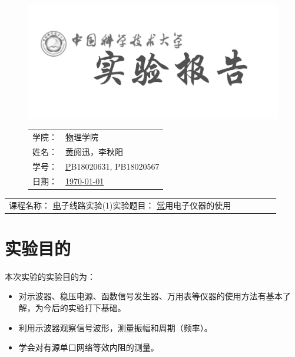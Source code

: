 \documentclass[a4paper,11pt,UTF8]{ctexart}
\newcommand{\major}{物理学院}
\newcommand{\name}{黄阅迅，李秋阳}
\newcommand{\stuid}{PB18020631, PB18020567}
\newcommand{\newdate}{\today}
\newcommand{\course}{电子线路实验(1)}
\newcommand{\newtitle}{常用电子仪器的使用}
\begin{document}
\thispagestyle{empty}
\begin{figure}[h]
  \begin{minipage}{0.6\linewidth}
    \centerline{\includegraphics[width=\linewidth]{logo.png}}
  \end{minipage}
  \hfill
  \begin{minipage}{.4\linewidth}
    \raggedleft
    \begin{tabular*}{.8\linewidth}{ll}
      学院： & \underline\major   \\
      姓名： & \underline\name    \\
      学号： & \underline\stuid   \\
      日期： & \underline\newdate \\
    \end{tabular*}
  \end{minipage}
\end{figure}

\begin{table}[!htbp]
  \centering
  \begin{tabular*}{\linewidth}{llllll}
    课程名称：  \underline\course   \qquad\qquad 实验题目：  \underline\newtitle  
  \end{tabular*}
\end{table}


\section{实验目的}
本次实验的实验目的为：
\begin{itemize}
  \item 对示波器、稳压电源、函数信号发生器、万用表等仪器的使用方法有基本了解，为今后的实验打下基础。
  \item 利用示波器观察信号波形，测量振幅和周期（频率）。
  \item 学会对有源单口网络等效内阻的测量。
\end{itemize}
\end{document}
